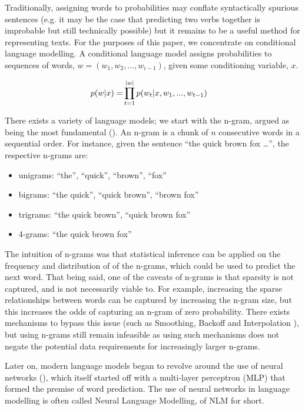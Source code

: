 \documentclass[12pt,twoside]{report}
\begin{document}
Traditionally, assigning words to probabilities may conflate syntactically spurious sentences (e.g. it may be the case that predicting two verbs together is improbable but still technically possible) but it remains to be a useful method for representing texts. For the purposes of this paper, we concentrate on conditional language modelling. A conditional language model assigns probabilities to sequences of words, $w = (w_1, w_2, ..., w_{i-1})$, given some conditioning variable, $x$. 

\begin{align}
	p(\boldmath{w}|x) = &{} \prod^{|w|}_{t=1}p(w_t|x,w_1, ..., w_{t-1})
\end{align}

There exists a variety of language models; we start with the n-gram, argued as being the most fundamental (\cite{le_recurrent_2018}). An n-gram is a chunk of $n$ consecutive words in a sequential order. For instance, given the sentence ``the quick brown fox \ldots'', the respective n-grams are: 

\begin{itemize}  
	\item unigrams: ``the'', ``quick'', ``brown'', ``fox''
	\item bigrams: ``the quick'', ``quick brown'', ``brown fox''
	\item trigrams: ``the quick brown'', ``quick brown fox''
	\item 4-grams: ``the quick brown fox''
\end{itemize}

The intuition of n-grams was that statistical inference can be applied on the frequency and distribution of of the n-grams, which could be used to predict the next word. That being said, one of the caveats of n-grams is that sparsity is not captured, and is not necessarily viable to. For example, increasing the sparse relationships between words can be captured by increasing the n-gram size, but this increases the odds of capturing an n-gram of zero probability. There exists mechanisms to bypass this issue (such as Smoothing, Backoff and Interpolation \cite{jurafsky_speech_2019}), but using n-grams still remain infeasible as using such mechanisms does not negate the potential data requirements for increasingly larger n-grams.

Later on, modern language models began to revolve around the use of neural networks (\cite{bengio_neural_2001}), which itself started off with a multi-layer perceptron (MLP) that formed the premise of word prediction. The use of neural networks in language modelling is often called Neural Language Modelling, of NLM for short.
\end{document}
